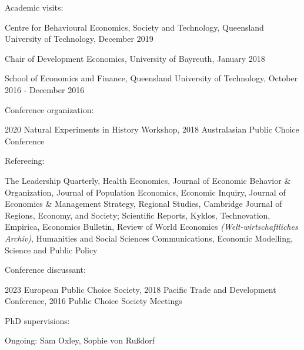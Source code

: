 \documentclass[letterpaper]{article}
\renewenvironment{itemize}{
  \begin{list}{}{
    \setlength{\leftmargin}{1.5em}
  }
}{
  \end{list}
}
\begin{document}
\begin{itemize}
	\item Academic visits:
	
	\begin{itemize}
				\item Centre for Behavioural Economics, Society and Technology, Queensland University of Technology, December 2019
		\item Chair of Development Economics, University of Bayreuth, January 2018
		\item School of Economics and Finance, Queensland University of Technology, October 2016 - December 2016
	\end{itemize}
	
	\item Conference organization:
	\begin{itemize}
		\item	2020 Natural Experiments in History Workshop, 2018 Australasian Public Choice Conference
	\end{itemize}
	

	
	\item Refereeing:
	\begin{itemize}
		
		\item The Leadership Quarterly, Health Economics, Journal of Economic Behavior \& Organization, Journal of Population Economics, Economic Inquiry, Journal of Economics \& Management Strategy, Regional Studies, Cambridge Journal of Regions, Economy, and Society; Scientific Reports, Kyklos, Technovation, Empirica, Economics Bulletin, Review of World Economics {\textit{(Welt-wirtschaftliches Archiv)}}, Humanities and Social Sciences Communications, Economic Modelling, Science and Public Policy	\end{itemize}
	
	\item Conference discussant:
	\begin{itemize}
		
		\item 2023 European Public Choice Society, 2018 Pacific Trade and Development Conference, 2016 Public Choice Society Meetings
	\end{itemize}
	
	\item PhD supervisions:
	\begin{itemize}
		\item Ongoing: Sam Oxley, Sophie von Rußdorf
	\end{itemize}
	

\end{itemize}
\end{document}
